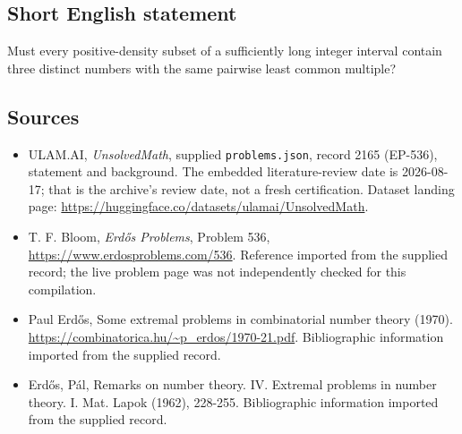 \documentclass[11pt,a4paper]{article}
\begin{document}
\subsection{Short English statement}

Must every positive-density subset of a sufficiently long integer interval contain three distinct numbers with the same pairwise least common multiple?

\subsection{Sources}

{\small

\begin{itemize}

\item[\hypertarget{source:2165:1}{S1}] ULAM.AI, \emph{UnsolvedMath}, supplied \texttt{problems.json}, record 2165 (EP-536), statement and background. The embedded literature-review date is 2026-08-17; that is the archive’s review date, not a fresh certification. Dataset landing page: \url{https://huggingface.co/datasets/ulamai/UnsolvedMath}.

\item[\hypertarget{source:2165:2}{S2}] T. F. Bloom, \emph{Erdős Problems}, Problem 536, \url{https://www.erdosproblems.com/536}. Reference imported from the supplied record; the live problem page was not independently checked for this compilation.

\item[\hypertarget{source:2165:3}{S3}] Paul Erdős, Some extremal problems in combinatorial number theory (1970). \url{https://combinatorica.hu/~p_erdos/1970-21.pdf}. Bibliographic information imported from the supplied record.

\item[\hypertarget{source:2165:4}{S4}] Erd\H{o}s, P\'{a}l, Remarks on number theory. IV. Extremal problems in number theory. I. Mat. Lapok (1962), 228-255. Bibliographic information imported from the supplied record.

\end{itemize}

}

\label{end:2165}
\end{document}
